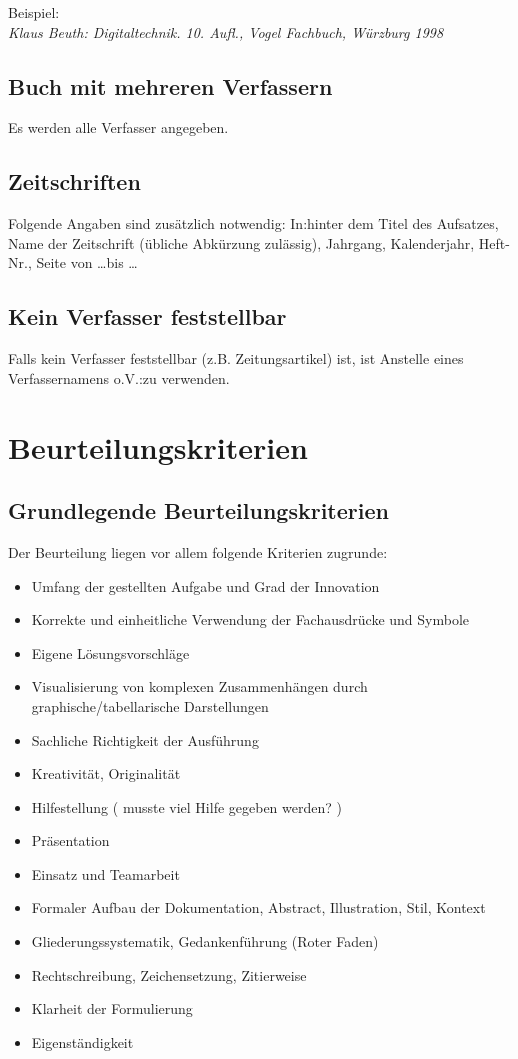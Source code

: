 Beispiel:\\ 
\emph{Klaus Beuth: Digitaltechnik. 10. Aufl., Vogel Fachbuch, Würzburg 1998}


\subsection{Buch mit mehreren Verfassern}
Es werden alle Verfasser angegeben.


\subsection{Zeitschriften}
Folgende Angaben sind zusätzlich notwendig: \glqq In:\grqq hinter dem Titel des Aufsatzes, Name der Zeitschrift (übliche Abkürzung zulässig), Jahrgang, Kalenderjahr, Heft-Nr., Seite von \ldots bis \ldots 


\subsection{Kein Verfasser feststellbar}
Falls kein Verfasser feststellbar (z.B. Zeitungsartikel) ist, ist Anstelle eines Verfassernamens \glqq o.V.:\grqq zu verwenden. 

\section{Beurteilungskriterien}


\subsection{Grundlegende Beurteilungskriterien}
Der Beurteilung liegen vor allem folgende Kriterien zugrunde:
\begin{itemize}
	\item Umfang der gestellten Aufgabe und Grad der Innovation 
	\item Korrekte und einheitliche Verwendung der Fachausdrücke und Symbole 
	\item Eigene Lösungsvorschläge 
	\item Visualisierung von komplexen Zusammenhängen durch graphische/tabellarische Darstellungen 
	\item Sachliche Richtigkeit der Ausführung 
	\item Kreativität, Originalität 
	\item Hilfestellung ( musste viel Hilfe gegeben werden? ) 
	\item Präsentation 
	\item Einsatz und Teamarbeit 
	\item Formaler Aufbau der Dokumentation, Abstract, Illustration, Stil, Kontext 
	\item Gliederungssystematik, Gedankenführung (\glqq Roter Faden\grqq) 
	\item Rechtschreibung, Zeichensetzung, Zitierweise 
	\item Klarheit der Formulierung
	\item Eigenständigkeit
\end{itemize}


